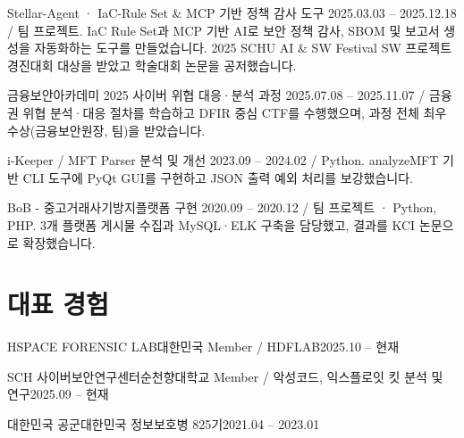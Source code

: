     \resumeProject
      {Stellar-Agent · IaC-Rule Set \& MCP 기반 정책 감사 도구}
      {2025.03.03 -- 2025.12.18 / 팀 프로젝트. IaC Rule Set과 MCP 기반 AI로 보안 정책 감사, SBOM 및 보고서 생성을 자동화하는 도구를 만들었습니다. 2025 SCHU AI \& SW Festival SW 프로젝트 경진대회 대상을 받았고 학술대회 논문을 공저했습니다.}
      \resumeItemListStart
      \resumeItemListEnd

    \resumeProject
      {금융보안아카데미 2025 사이버 위협 대응·분석 과정}
      {2025.07.08 -- 2025.11.07 / 금융권 위협 분석·대응 절차를 학습하고 DFIR 중심 CTF를 수행했으며, 과정 전체 최우수상(금융보안원장, 팀)을 받았습니다.}
      \resumeItemListStart
      \resumeItemListEnd

    \resumeProject
      {i-Keeper / MFT Parser 분석 및 개선}
      {2023.09 -- 2024.02 / Python. analyzeMFT 기반 CLI 도구에 PyQt GUI를 구현하고 JSON 출력 예외 처리를 보강했습니다.}

    \resumeProject
      {BoB - 중고거래사기방지플랫폼 구현}
      {2020.09 -- 2020.12 / 팀 프로젝트 · Python, PHP. 3개 플랫폼 게시물 수집과 MySQL·ELK 구축을 담당했고, 결과를 KCI 논문으로 확장했습니다.}
  \resumeSubHeadingListEnd

\section{대표 경험}
  \resumeSubHeadingListStart
    \resumeSubheading
      {HSPACE FORENSIC LAB}{대한민국}
      {Member / HDFLAB}{2025.10 -- 현재}
      \resumeItemListStart
      \resumeItemListEnd

    \resumeSubheading
      {SCH 사이버보안연구센터}{순천향대학교}
      {Member / 악성코드, 익스플로잇 킷 분석 및 연구}{2025.09 -- 현재}
      \resumeItemListStart
      \resumeItemListEnd

    \resumeSubheading
      {대한민국 공군}{대한민국}
      {정보보호병 825기}{2021.04 -- 2023.01}
      \resumeItemListStart
      \resumeItemListEnd

